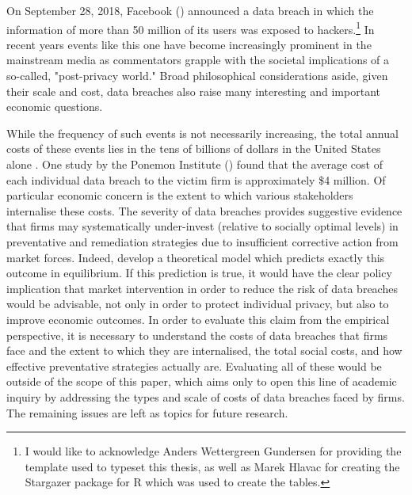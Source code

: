 \documentclass[../Main.tex]{subfiles}
\begin{document}
On September 28, 2018, Facebook (\citeyear{facebook2018}) announced a data breach in which the information of more than 50 million of its users was exposed to hackers.\footnote{I would like to acknowledge Anders Wettergreen Gundersen for providing the template used to typeset this thesis, as well as Marek Hlavac for creating the Stargazer package for R which was used to create the tables.} In recent years events like this one have become increasingly prominent in the mainstream media as commentators grapple with the societal implications of a so-called, "post-privacy world." Broad philosophical considerations aside, given their scale and cost, data breaches also raise many interesting and important economic questions.

While the frequency of such events is not necessarily increasing, the total annual costs of these events lies in the tens of billions of dollars in the United States alone \citep{edwards2016}. One study by the Ponemon Institute (\citeyear{ponemon2018}) found that the average cost of each individual data breach to the victim firm is approximately \$4 million. Of particular economic concern is the extent to which various stakeholders internalise these costs. The severity of data breaches provides suggestive evidence that firms may systematically under-invest (relative to socially optimal levels) in preventative and remediation strategies due to insufficient corrective action from market forces. Indeed, \cite{roberds2009} develop a theoretical model which predicts exactly this outcome in equilibrium. If this prediction is true, it would have the clear policy implication that market intervention in order to reduce the risk of data breaches would be advisable, not only in order to protect individual privacy, but also to improve economic outcomes. In order to evaluate this claim from the empirical perspective, it is necessary to understand the costs of data breaches that firms face and the extent to which they are internalised, the total social costs, and how effective preventative strategies actually are. Evaluating all of these would be outside of the scope of this paper, which aims only to open this line of academic inquiry by addressing the types and scale of costs of data breaches faced by firms. The remaining issues are left as topics for future research.
\end{document}
